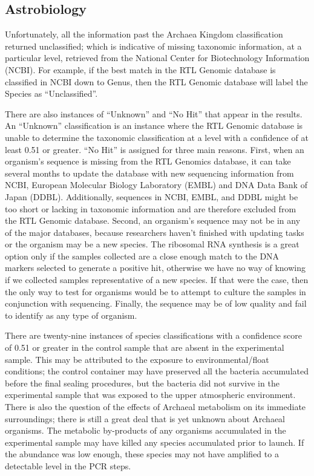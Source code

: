 \subsection{Astrobiology}
\label{sec:Astrobiology Results Discussion}

Unfortunately, all the information past the Archaea Kingdom classification returned unclassified; which is indicative of missing taxonomic information, at a particular level, retrieved from the National Center for Biotechnology Information (NCBI). For example, if the best match in the RTL Genomic database is classified in NCBI down to Genus, then the RTL Genomic database will label the Species as “Unclassified”. 


There are also instances of “Unknown” and “No Hit” that appear in the results. An “Unknown” classification is an instance where the RTL Genomic database is unable to determine the taxonomic classification at a level with a confidence of at least 0.51 or greater. “No Hit” is assigned for three main reasons. First, when an organism’s sequence is missing from the RTL Genomics database, it can take several months to update the database with new sequencing information from NCBI, European Molecular Biology Laboratory (EMBL) and DNA Data Bank of Japan (DDBL). Additionally, sequences in NCBI, EMBL, and DDBL might be too short or lacking in taxonomic information and are therefore excluded from the RTL Genomic database. Second, an organism’s sequence may not be in any of the major databases, because researchers haven’t finished with updating tasks or the organism may be a new species. The ribosomal RNA synthesis is a great option only if the samples collected are a close enough match to the DNA markers selected to generate a positive hit, otherwise we have no way of knowing if we collected samples representative of a new species. If that were the case, then the only way to test for organisms would be to attempt to culture the samples in conjunction with sequencing. Finally, the sequence may be of low quality and fail to identify as any type of organism. 


There are twenty-nine instances of species classifications with a confidence score of 0.51 or greater in the control sample that are absent in the experimental sample. This may be attributed to the exposure to environmental/float conditions; the control container may have preserved all the bacteria accumulated before the final sealing procedures, but the bacteria did not survive in the experimental sample that was exposed to the upper atmospheric environment. There is also the question of the effects of Archaeal metabolism on its immediate surroundings; there is still a great deal that is yet unknown about Archaeal organisms. The metabolic by-products of any organisms accumulated in the experimental sample may have killed any species accumulated prior to launch.  If the abundance was low enough, these species may not have amplified to a detectable level in the PCR steps.




